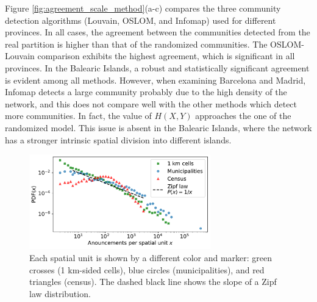 Figure \ref{fig:agreement_scale_method}(a-c) compares the three community detection algorithms (Louvain, OSLOM, and Infomap) used for different provinces. In all cases, the agreement between the communities detected from the real partition is higher than that of the randomized communities. The OSLOM-Louvain comparison exhibits the highest agreement, which is significant in all provinces. In the Balearic Islands, a robust and statistically significant agreement is evident among all methods. However, when examining Barcelona and Madrid, Infomap detects a large community probably due to the high density of the network, and this does not compare well with the other methods which detect more communities. In fact, the value of $H(X,Y)$ approaches the one of the randomized model. This issue is absent in the Balearic Islands, where the network has a stronger intrinsic spatial division into different islands.

\begin{figure}[t]
    \centering
    \includegraphics[width = 0.7\textwidth]{Figs/Idealista_segmentation/Distribution_adds_census_cell.pdf}
	\caption[Distribution of listings for different spatial units.]{ Each spatial unit is shown by a different color and marker: green crosses (1 km-sided cells), blue circles (municipalities), and red triangles (census). The dashed black line shows the slope of a Zipf law distribution. \label{fig:distribution_announcements}}
\end{figure}


